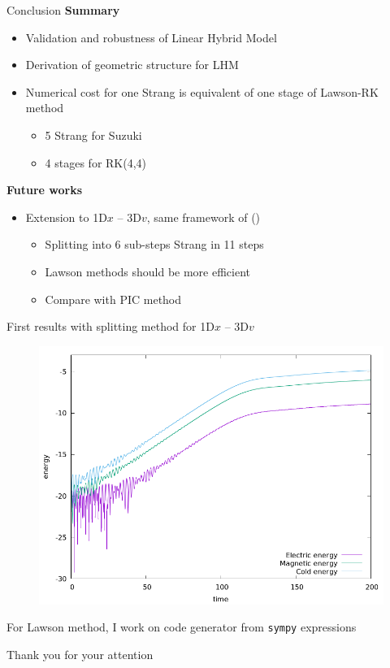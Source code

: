 \documentclass{beamer}
\newcommand{\arrow}{{\color{PLB}\ding{220}}}
\newcommand{\mbold}[1]{{\textbf{\color{PLB}#1}}}
\newcommand{\customcite}[1]{\citeauthor{#1} (\citeyear{#1})}
\begin{document}
\begin{frame}{Conclusion}
  \mbold{Summary}
  \begin{itemize}
    \item Validation and robustness of Linear Hybrid Model
    \item Derivation of geometric structure for LHM
    \item Numerical cost for one Strang is equivalent of one stage of Lawson-RK method \begin{itemize}
        \item 5 Strang for Suzuki
        \item 4 stages for RK(4,4)
      \end{itemize}
  \end{itemize}

  \mbold{Future works}
  \begin{itemize}
    \item Extension to 1D$x$ -- 3D$v$, same framework of {\color{PLB}\customcite{Holderied:2020}}\begin{itemize}
      \item Splitting into 6 sub-steps \arrow Strang in 11 steps
      \item Lawson methods should be more efficient
      \item Compare with PIC method
    \end{itemize}
  \end{itemize}
\end{frame}

\begin{frame}[t]
  First results with splitting method for 1D$x$ -- 3D$v$
  \begin{figure}\centering
    \includegraphics[height=0.8\textheight]{img/energy3dv.png}
  \end{figure}
  For Lawson method, I work on code generator from \texttt{sympy} expressions
\end{frame}

\begin{frame}[t]
  \vfill
  { Thank you for your attention}
  \vfill
\end{frame}
\end{document}
